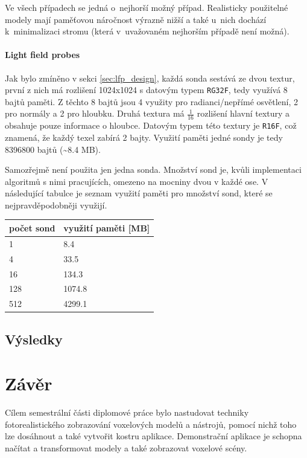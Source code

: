Ve všech případech se jedná o~nejhorší možný případ. Realisticky použitelné modely mají paměťovou náročnost výrazně nižší a také u~nich dochází k~minimalizaci stromu (která v~uvažovaném nejhorším případě není možná).


\subsubsection{Light field probes}
Jak bylo zmíněno v sekci \ref{sec:lfp_design}, každá sonda sestává ze dvou textur, první z nich má rozlišení 1024x1024 s datovým typem \texttt{RG32F}, tedy využívá 8 bajtů paměti. Z těchto 8 bajtů jsou 4 využity pro radianci/nepřímé osvětlení, 2 pro normály a 2 pro hloubku. Druhá textura má $\frac{1}{16}$ rozlišení hlavní textury a obsahuje pouze informace o hloubce. Datovým typem této textury je \texttt{R16F}, což znamená, že každý texel zabírá 2 bajty. Využití paměti jedné sondy je tedy 8396800 bajtů (\textasciitilde{}8.4 MB).

Samozřejmě není použita jen jedna sonda. Množství sond je, kvůli implementaci algoritmů s nimi pracujících, omezeno na mocniny dvou v každé ose. V následující tabulce je seznam využití paměti pro množství sond, které se nejpravděpodobněji využijí.

\begin{table}[H]
	\centering
\begin{tabular}{|l|l|}
\hline
počet sond & využití paměti {[}MB{]} \\ \hline
1          & 8.4                     \\ \hline
4          & 33.5                    \\ \hline
16         & 134.3                   \\ \hline
128        & 1074.8                  \\ \hline
512        & 4299.1                  \\ \hline
\end{tabular}
\end{table}


\section{Výsledky}

\chapter{Závěr}
\label{zaver}
Cílem semestrální části diplomové práce bylo nastudovat techniky fotorealistického zobrazování voxelových modelů a nástrojů, pomocí nichž toho lze dosáhnout a také vytvořit kostru aplikace. Demonstrační aplikace je schopna načítat a transformovat modely a také zobrazovat voxelové scény.

